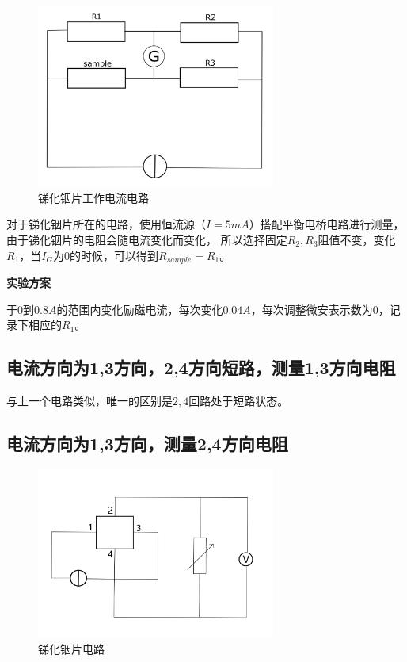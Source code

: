 \documentclass[a4paper,UTF8]{ctexart}
\begin{document}
\begin{figure}[H]
    \centering
    \begin{minipage}[b]{0.9\textwidth}
        \centering
        \includegraphics[width=0.7\textwidth]{./1.png}
        \caption{锑化铟片工作电流电路}
    \end{minipage}
\end{figure}

对于锑化铟片所在的电路，使用恒流源（$I = 5 mA$）搭配平衡电桥电路进行测量，由于锑化铟片的电阻会随电流变化而变化，
所以选择固定$R_2,R_3$阻值不变，变化$R_1$，当$I_G$为0的时候，可以得到$R_{sample}=R_1$。

{\bfseries 实验方案}

于$0$到$0.8A$的范围内变化励磁电流，每次变化$0.04A$，每次调整微安表示数为0，记录下相应的$R_1$。

\subsection{电流方向为1,3方向，2,4方向短路，测量1,3方向电阻}

与上一个电路类似，唯一的区别是$2,4$回路处于短路状态。

\subsection{电流方向为1,3方向，测量2,4方向电阻}

\begin{figure}[H]
    \centering
    \begin{minipage}[b]{0.9\textwidth}
        \centering
        \includegraphics[width=0.7\textwidth]{./2.png}
        \caption{锑化铟片电路}
    \end{minipage}
\end{figure}
\end{document}
